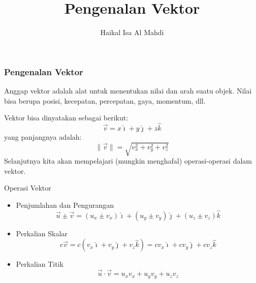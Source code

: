 \documentclass{beamer}
\title{Pengenalan Vektor}
\author{Haikal Isa Al Mahdi}
\date{}
\begin{document}
\begin{frame}
\titlepage
\end{frame}


\begin{frame}
\frametitle{Pengenalan Vektor}
Anggap vektor adalah alat untuk menentukan nilai dan arah suatu objek. Nilai bisa berupa posisi, kecepatan, percepatan, gaya, momentum, dll.

Vektor bisa dinyatakan sebagai berikut:
\begin{equation*}
\vec{v} = x\hat{\imath} + y\hat{\jmath} + z\hat{k}
\end{equation*}
yang panjangnya adalah:
\begin{equation*}
\|\vec{v}\| = \sqrt{v_x^2 + v_y^2 + v_z^2}
\end{equation*}
Selanjutnya kita akan mempelajari (mungkin menghafal) operasi-operasi dalam vektor.
\end{frame}

\begin{frame}{Operasi Vektor}
\begin{itemize}
   \item Penjumlahan dan Pengurangan
       \begin{equation*}
           \vec{u} \pm \vec{v} = (u_x \pm v_x)\hat{\imath} + (u_y \pm v_y)\hat{\jmath} + (u_z \pm v_z)\hat{k}
       \end{equation*}
   \item Perkalian Skalar
       \begin{equation*}
           c\vec{v} = c(v_x\hat{\imath} + v_y\hat{\jmath} + v_z\hat{k}) = cv_x\hat{\imath} + cv_y\hat{\jmath} + cv_z\hat{k}
       \end{equation*}
   \item Perkalian Titik
       \begin{equation*}
           \vec{u} \cdot \vec{v} = u_xv_x + u_yv_y + u_zv_z
       \end{equation*}
\end{itemize}
\end{frame}
\end{document}
